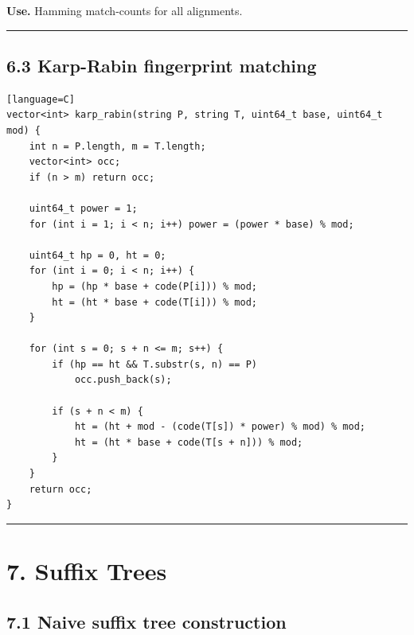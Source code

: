\documentclass[11pt]{article}
\begin{document}
\textbf{Use.} Hamming match-counts for all alignments.

\begin{center}\rule{0.5\linewidth}{0.5pt}\end{center}

\subsection{6.3 Karp-Rabin fingerprint matching}\label{karp-rabin-fingerprint-matching}

\begin{verbatim}[language=C]
vector<int> karp_rabin(string P, string T, uint64_t base, uint64_t mod) {
    int n = P.length, m = T.length;
    vector<int> occ;
    if (n > m) return occ;

    uint64_t power = 1;
    for (int i = 1; i < n; i++) power = (power * base) % mod;

    uint64_t hp = 0, ht = 0;
    for (int i = 0; i < n; i++) {
        hp = (hp * base + code(P[i])) % mod;
        ht = (ht * base + code(T[i])) % mod;
    }

    for (int s = 0; s + n <= m; s++) {
        if (hp == ht && T.substr(s, n) == P)
            occ.push_back(s);

        if (s + n < m) {
            ht = (ht + mod - (code(T[s]) * power) % mod) % mod;
            ht = (ht * base + code(T[s + n])) % mod;
        }
    }
    return occ;
}
\end{verbatim}

\begin{center}\rule{0.5\linewidth}{0.5pt}\end{center}

\section{7. Suffix Trees}\label{suffix-trees}

\subsection{7.1 Naive suffix tree construction}\label{naive-suffix-tree-construction}
\end{document}
